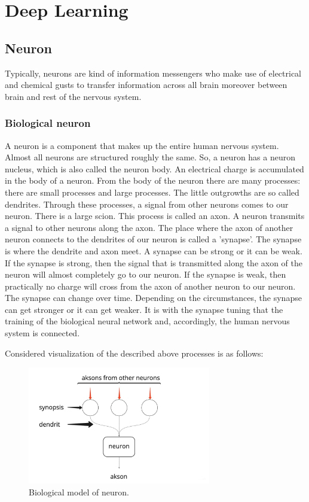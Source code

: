 \chapter{Deep Learning}
\label{ch:deep_learning}

\section{Neuron}
Typically, neurons are kind of information messengers who make use of electrical and chemical gusts to transfer information across all brain moreover between brain and rest of the nervous system.

\subsection{Biological neuron}
A neuron is a component that makes up the entire human nervous system. Almost all neurons are structured roughly the same. So, a neuron has a neuron nucleus, which is also called the neuron body. An electrical charge is accumulated in the body of a neuron. From the body of the neuron there are many processes: there are small processes and large processes. The little outgrowths are so called dendrites. Through these processes, a signal from other neurons comes to our neuron. There is a large scion. This process is called an axon. A neuron transmits a signal to other neurons along the axon. The place where the axon of another neuron connects to the dendrites of our neuron is called a 'synapse'. The synapse is where the dendrite and axon meet. A synapse can be strong or it can be weak. If the synapse is strong, then the signal that is transmitted along the axon of the neuron will almost completely go to our neuron. If the synapse is weak, then practically no charge will cross from the axon of another neuron to our neuron. The synapse can change over time. Depending on the circumstances, the synapse can get stronger or it can get weaker. It is with the synapse tuning that the training of the biological neural network and, accordingly, the human nervous system is connected.

Considered visualization of the described above processes is as follows:
\begin{figure}[h]
    \centering \includegraphics[width=8cm]{images/biological_neuron.jpg}
    \caption {Biological model of neuron.}
\end{figure}    

